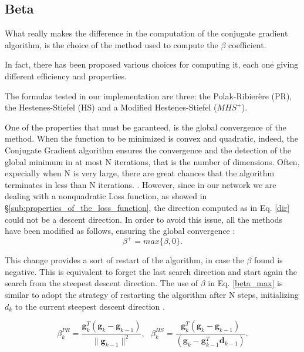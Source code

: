 		\subsection{Beta}
		\label{sub:beta}
			What really makes the difference in the computation of the conjugate gradient algorithm, is the choice of the method used to compute the $\beta$ coefficient.

			In fact, there has been proposed various choices for computing it, each one giving different efficiency and properties.

			The formulas tested in our implementation are three: the Polak-Ribierère (PR), the Hestenes-Stiefel (HS) and a Modified Hestenes-Stiefel ($MHS^+$).

			One of the properties that must be garanteed, is the global convergence of the method. When the function to be minimized is convex and quadratic, indeed, the Conjugate Gradient algorithm ensures the convergence and the detection of the global minimum in at most N iterations, that is the number of dimensions. Often, expecially when N is very large, there are great chances that the algorithm terminates in less than N iterations.
			\cite{DIXON-1975}.
			However, since in our network we are dealing with a nonquadratic Loss function, as showed in \S\ref{sub:properties_of_the_loss_function}, the direction computed as in Eq. \ref{dir} could not be a descent direction. In order to avoid this issue, all the methods have been modified as follows, ensuring the global convergence \cite{doi:10.1137/0802003}:
			\begin{equation}
			\label{beta_max}
				 \beta^+ = max\{\beta, 0\}.
			\end{equation}

			This change provides a sort of restart of the algorithm, in case the $\beta$ found is negative. This is equivalent to forget the last search direction and start again the search from the steepest descent direction. The use of $\beta$ in Eq. \ref{beta_max} is similar to adopt the strategy of restarting the algorithm after N steps, initializing $d_k$ to the current steepest descent direction
			\cite{MOLLER1993525,Gilbert-1992}.

			\begin{equation}
			\label{betas}
				 \beta^{PR}_k = \frac{\textbf{g}_k^T(\textbf{g}_k-\textbf{g}_{k-1})}{\|\textbf{g}_{k-1}\|^2}, \text{ }
 				 \beta^{HS}_k = \frac{\textbf{g}_k^T(\textbf{g}_k-\textbf{g}_{k-1})}{(\textbf{g}_k-\textbf{g}_{k-1}^T\textbf{d}_{k-1})}.
			\end{equation}

